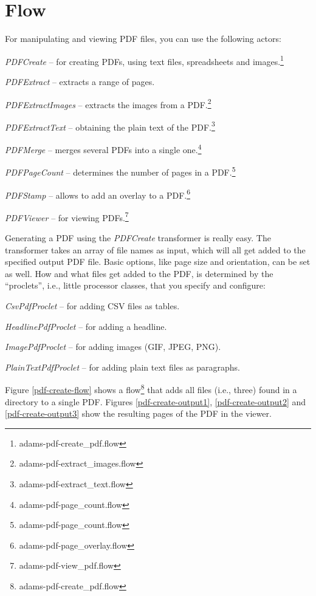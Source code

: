\documentclass[a4paper]{book}
\begin{document}
\chapter{Flow}
For manipulating and viewing PDF files, you can use the following actors:
\begin{tight_itemize}
	\item \textit{PDFCreate} -- for creating PDFs, using text files, 
	spreadsheets and images.\footnote{adams-pdf-create\_pdf.flow}
	\item \textit{PDFExtract} -- extracts a range of pages.
	\item \textit{PDFExtractImages} -- extracts the images from a PDF.\footnote{adams-pdf-extract\_images.flow}
	\item \textit{PDFExtractText} -- obtaining the plain text of the PDF.\footnote{adams-pdf-extract\_text.flow}
	\item \textit{PDFMerge} -- merges several PDFs into a single one.\footnote{adams-pdf-page\_count.flow}
	\item \textit{PDFPageCount} -- determines the number of pages in a 
	PDF.\footnote{adams-pdf-page\_count.flow}
	\item \textit{PDFStamp} -- allows to add an overlay to a PDF.\footnote{adams-pdf-page\_overlay.flow}
	\item \textit{PDFViewer} -- for viewing PDFs.\footnote{adams-pdf-view\_pdf.flow}
\end{tight_itemize}

Generating a PDF using the \textit{PDFCreate} transformer is really easy.
The transformer takes an array of file names as input, which will all get added
to the specified output PDF file. Basic options, like page size and orientation,
can be set as well. How and what files get added to the PDF, is determined by
the ``proclets'', i.e., little processor classes, that you specify and configure:
\begin{tight_itemize}
	\item \textit{CsvPdfProclet} -- for adding CSV files as tables.
	\item \textit{HeadlinePdfProclet} -- for adding a headline.
	\item \textit{ImagePdfProclet} -- for adding images (GIF, JPEG, PNG).
	\item \textit{PlainTextPdfProclet} -- for adding plain text files as paragraphs.
\end{tight_itemize}

Figure \ref{pdf-create-flow} shows a flow\footnote{adams-pdf-create\_pdf.flow} 
that adds all files (i.e., three) found in a directory to a single PDF. 
Figures \ref{pdf-create-output1}, \ref{pdf-create-output2} and 
\ref{pdf-create-output3} show the resulting pages of the PDF in the viewer.
\end{document}
